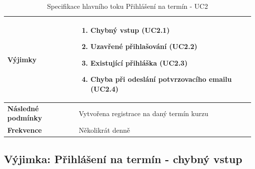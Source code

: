 \documentclass[12pt,a4paper,titlepage,final]{report}
\begin{document}
\begin{table}[!h]
\begin{center}
\begin{tabular}{ | p{4.2cm} | p{12.2cm} | }
    \textbf{Výjimky} & 
    \vspace{-3.5mm}
    \begin{enumerate}
	    \itemsep0em
     	\item Chybný vstup (UC2.1)
	    \item Uzavřené přihlašování (UC2.2)
    	\item Existující přihláška (UC2.3)
	    \item Chyba při odeslání potvrzovacího emailu (UC2.4)
    \end{enumerate}
	   
    \\ \hline
    
    \textbf{Následné podmínky} & Vytvořena registrace na daný termín kurzu
    \\ \hline        
    
	\textbf{Frekvence} & Několikrát denně
	\\ \hline
		
    \end{tabular}
	\caption{Specifikace hlavního toku Přihlášení na termín - UC2}    
	\end{center}

\end{table}

\newpage

\subsection{Výjimka: Přihlášení na termín - chybný vstup}
\end{document}
